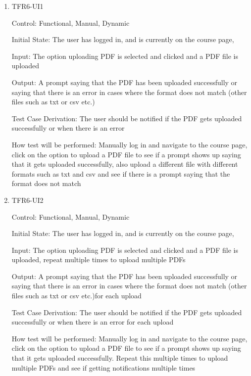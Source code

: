 \documentclass[12pt, titlepage]{article}
\begin{document}
  \begin{enumerate}[resume]
  \item{TFR6-UI1\\}
  
  Control: Functional, Manual, Dynamic
            
  Initial State: The user has logged in, and is currently on the course page,  
            
  Input: The option uploading PDF is selected and clicked and a PDF file is uploaded 
            
  Output: A prompt saying that the PDF has been uploaded successfully or saying that there is an error in cases where the format does not match (other files such as txt or csv etc.)
  
  Test Case Derivation: The user should be notified if the PDF gets uploaded successfully or when there is an error 
            
  How test will be performed: Manually log in and navigate to the course page, click on the option to upload a PDF file to see if a prompt shows up saying that it gets uploaded successfully, also upload a different file with different formats such as txt and csv and see if there is a prompt saying that the format does not match
  \item{TFR6-UI2\\}
  
  Control: Functional, Manual, Dynamic
            
  Initial State: The user has logged in, and is currently on the course page,  
            
  Input: The option uploading PDF is selected and clicked and a PDF file is uploaded, repeat multiple times to upload multiple PDFs
            
  Output: A prompt saying that the PDF has been uploaded successfully or saying that there is an error in cases where the format does not match (other files such as txt or csv etc.)for each upload
  
  Test Case Derivation: The user should be notified if the PDF gets uploaded successfully or when there is an error for each upload
            
  How test will be performed: Manually log in and navigate to the course page, click on the option to upload a PDF file to see if a prompt shows up saying that it gets uploaded successfully. Repeat this multiple times to upload multiple PDFs and see if getting notifications multiple times 
  

\end{enumerate}
\end{document}

